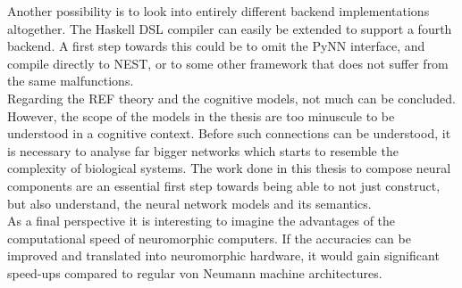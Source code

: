 \documentclass[report.tex]{subfiles}
\begin{document}
Another possibility is to look into entirely different backend implementations
altogether.
The Haskell \gls{DSL} compiler can easily be extended to support a fourth
backend.
A first step towards this could be to omit the PyNN interface, and compile
directly to NEST, or to some other framework that does not suffer from the same
malfunctions.
\\[0.1cm]

Regarding the REF theory and the cognitive models, not much can be concluded.
However, the scope of the models in the thesis are too minuscule to be understood
in a cognitive context.
Before such connections can be understood, it is necessary to analyse far bigger
networks which starts to resemble the complexity of biological systems.
The work done in this thesis to compose neural components are an essential first
step towards being able to not just construct, but also understand, the neural
network models and its semantics.
\\[0.1cm]

As a final perspective it is interesting to imagine the advantages of the
computational speed of neuromorphic computers.
If the accuracies can be improved and translated into neuromorphic hardware, it
would gain significant speed-ups compared to regular von Neumann machine
architectures.

\FloatBarrier
\end{document}
